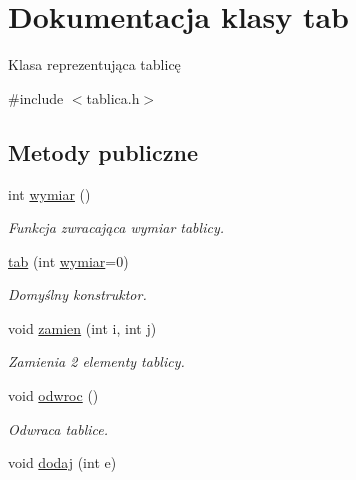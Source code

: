\hypertarget{classtab}{\section{\-Dokumentacja klasy tab}
\label{classtab}
}


\-Klasa reprezentująca tablicę  




{\ttfamily \#include $<$tablica.\-h$>$}

\subsection*{\-Metody publiczne}
\begin{DoxyCompactItemize}
\item 
\hypertarget{classtab_ae9a39f118e9d520422a702f34a02a6d4}{int \hyperlink{classtab_ae9a39f118e9d520422a702f34a02a6d4}{wymiar} ()}\label{classtab_ae9a39f118e9d520422a702f34a02a6d4}

\begin{DoxyCompactList}\small\item\em \-Funkcja zwracająca wymiar tablicy. \end{DoxyCompactList}\item 
\hypertarget{classtab_a62ce94ba44cb1cad08a795a6e694379f}{\hyperlink{classtab_a62ce94ba44cb1cad08a795a6e694379f}{tab} (int \hyperlink{classtab_ae9a39f118e9d520422a702f34a02a6d4}{wymiar}=0)}\label{classtab_a62ce94ba44cb1cad08a795a6e694379f}

\begin{DoxyCompactList}\small\item\em \-Domyślny konstruktor. \end{DoxyCompactList}\item 
\hypertarget{classtab_aa6b0961d15e5ad55f4dc84d5ca0f693b}{void \hyperlink{classtab_aa6b0961d15e5ad55f4dc84d5ca0f693b}{zamien} (int i, int j)}\label{classtab_aa6b0961d15e5ad55f4dc84d5ca0f693b}

\begin{DoxyCompactList}\small\item\em \-Zamienia 2 elementy tablicy. \end{DoxyCompactList}\item 
\hypertarget{classtab_ac618d6a3d5e17cd6afb0ba5c225f4416}{void \hyperlink{classtab_ac618d6a3d5e17cd6afb0ba5c225f4416}{odwroc} ()}\label{classtab_ac618d6a3d5e17cd6afb0ba5c225f4416}

\begin{DoxyCompactList}\small\item\em \-Odwraca tablice. \end{DoxyCompactList}\item 
\hypertarget{classtab_ae6e506c6264acf4367f6927624e3fed0}{void \hyperlink{classtab_ae6e506c6264acf4367f6927624e3fed0}{dodaj} (int e)}\label{classtab_ae6e506c6264acf4367f6927624e3fed0}


\end{DoxyCompactItemize}
